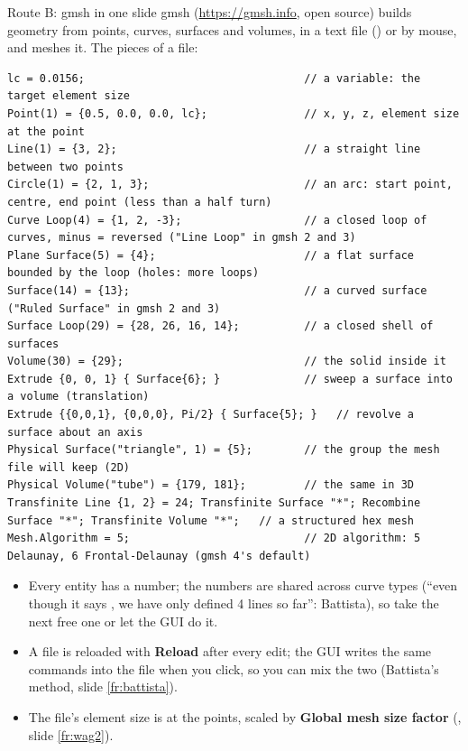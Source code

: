 \documentclass[aspectratio=169,11pt]{beamer}
\begin{document}
\begin{frame}[fragile]{Route B: gmsh in one slide}
\label{fr:gmshbasics}
\footnotesize
gmsh (\url{https://gmsh.info}, open source) builds geometry from points, curves, surfaces and volumes, in a text file () or by mouse, and meshes it. The pieces of a  file:
\begin{lstlisting}[style=geotiny]
lc = 0.0156;                                  // a variable: the target element size
Point(1) = {0.5, 0.0, 0.0, lc};               // x, y, z, element size at the point
Line(1) = {3, 2};                             // a straight line between two points
Circle(1) = {2, 1, 3};                        // an arc: start point, centre, end point (less than a half turn)
Curve Loop(4) = {1, 2, -3};                   // a closed loop of curves, minus = reversed ("Line Loop" in gmsh 2 and 3)
Plane Surface(5) = {4};                       // a flat surface bounded by the loop (holes: more loops)
Surface(14) = {13};                           // a curved surface ("Ruled Surface" in gmsh 2 and 3)
Surface Loop(29) = {28, 26, 16, 14};          // a closed shell of surfaces
Volume(30) = {29};                            // the solid inside it
Extrude {0, 0, 1} { Surface{6}; }             // sweep a surface into a volume (translation)
Extrude {{0,0,1}, {0,0,0}, Pi/2} { Surface{5}; }   // revolve a surface about an axis
Physical Surface("triangle", 1) = {5};        // the group the mesh file will keep (2D)
Physical Volume("tube") = {179, 181};         // the same in 3D
Transfinite Line {1, 2} = 24; Transfinite Surface "*"; Recombine Surface "*"; Transfinite Volume "*";   // a structured hex mesh
Mesh.Algorithm = 5;                           // 2D algorithm: 5 Delaunay, 6 Frontal-Delaunay (gmsh 4's default)
\end{lstlisting}
\begin{itemize}
  \item Every entity has a number; the numbers are shared across curve types (``even though it says , we have only defined 4 lines so far'': Battista), so take the next free one or let the GUI do it.
  \item A  file is reloaded with \textbf{Reload} after every edit; the GUI writes the same commands into the file when you click, so you can mix the two (Battista's method, slide \ref{fr:battista}).
  \item The file's element size is  at the points, scaled by \textbf{Global mesh size factor} (, slide \ref{fr:wag2}).
\end{itemize}
\end{frame}
\end{document}
